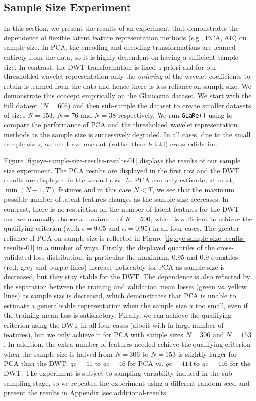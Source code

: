 \subsection{Sample Size Experiment}\label{sec:sample-size-experiment}

In this section, we present the results of an experiment that demonstrates the dependence of flexible latent feature representation methods (e.g., PCA, AE) on sample size.
In PCA, the encoding and decoding transformations are learned entirely from the data, so it is highly dependent on having a sufficient sample size.
In contrast, the DWT transformation is fixed a-priori and for our thresholded wavelet representation only the \emph{ordering} of the wavelet coefficients to retain is learned from the data and hence there is less reliance on sample size.
We demonstrate this concept empirically on the Glaucoma dataset. We start with the full dataset ($N=606$) and then sub-sample the dataset to create smaller datasets of sizes $N=153$, $N=76$ and $N=38$ respectively.
We run \texttt{GLaRe()} using to compare the performance of PCA and the thresholded wavelet representation methods as the sample size is successively degraded.
In all cases, due to the small sample sizes, we use leave-one-out (rather than $k$-fold) cross-validation.

Figure \ref{fig:eye-sample-size-results-results-01} displays the results of our sample size experiment.
The PCA results are displayed in the first row and the DWT results are displayed in the second row.
As PCA can only estimate, at most, $\min(N-1, T)$ features and in this case $N<T$, we see that the maximum possible number of latent features changes as the sample size decreases.
In contrast, there is no restriction on the number of latent features for the DWT and we manually choose a maximum of $K=500$, which is sufficient to achieve the qualifying criterion (with $\epsilon=0.05$ and $\alpha=0.95$) in all four cases.
The greater reliance of PCA on sample size is reflected in Figure \ref{fig:eye-sample-size-results-results-01} in a number of ways.
Firstly, the displayed quantiles of the cross-validated loss distribution, in particular the maximum, $0.95$ and $0.9$ quantiles (red, grey and purple lines) increase noticeably for PCA as sample size is decreased, but they stay stable for the DWT.
The dependence is also reflected by the separation between the training and validation mean losses (green vs. yellow lines) as sample size is decreased, which demonstrates that PCA is unable to estimate a generalisable representation when the sample size is too small, even if the training mean loss is satisfactory.
Finally, we can achieve the qualifying criterion using the DWT in all four cases (albeit with fa large number of features), but we only achieve it for PCA with sample sizes $N=306$ and $N=153$.
In addition, the extra number of features needed achieve the qualifying criterion when the sample size is halved from $N=306$ to $N=153$ is slightly larger for PCA than the DWT: $qc=41$ to $qc=46$ for PCA vs. $qc=414$ to $qc=416$ for the DWT.
The experiment is subject to sampling variability induced in the sub-sampling stage, so we repeated the experiment using a different random seed and present the results in Appendix \ref{sec:additional-results}.

